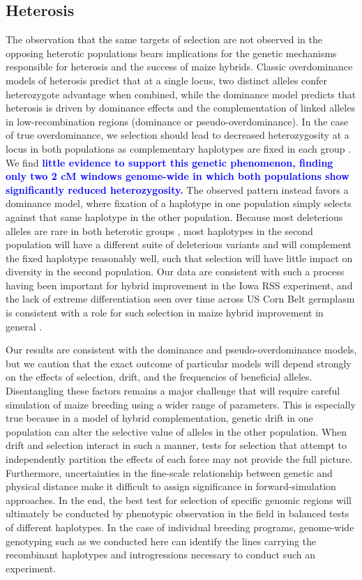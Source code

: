\documentclass[twocolumn,twoside,letterpaper]{article}
\newcommand{\rev}[1]{\textcolor{blue}{\bf #1}}
\begin{document}
\subsection*{Heterosis}

The observation that the same targets of selection are not observed in the opposing heterotic populations bears implications for the genetic mechanisms responsible for heterosis and the success of maize hybrids. 
Classic overdominance models of heterosis predict that at a single locus, two distinct alleles confer heterozygote advantage when combined, while the dominance model predicts that heterosis is driven by dominance effects and the complementation of linked alleles in low-recombination regions (dominance or pseudo-overdominance). 
In the case of true overdominance, we selection should lead to decreased heterozygosity at a locus in both populations as complementary haplotypes are fixed in each group \rev{\citep[e.g.][]{guo2014maize}}.
We find \rev{little evidence to support this genetic phenomenon, finding only two 2 cM windows genome-wide in which both populations show significantly reduced heterozygosity.} 
The observed pattern instead favors a dominance model, where fixation of a haplotype in one population simply selects against that same haplotype in the other population. 
Because most deleterious alleles are rare in both heterotic groups \citep{Mezmouk2014}, most haplotypes in the second population will have a different suite of deleterious variants and will complement the fixed haplotype reasonably well, such that selection will have little impact on diversity in the second population. 
Our data are consistent with such a process having been important for hybrid improvement in the Iowa RSS experiment, and the lack of extreme differentiation seen over time across US Corn Belt germplasm is consistent with a role for such selection in maize hybrid improvement in general \citep{van2012historical}.

Our results are consistent with the dominance and pseudo-overdominance models, but we caution that the exact outcome of particular models will depend strongly on the effects of selection, drift, and the frequencies of beneficial alleles. 
Disentangling these factors remains a major challenge that will require careful simulation of maize breeding using a wider range of parameters. 
This is especially true because in a model of hybrid complementation, genetic drift in one population can alter the selective value of alleles in the other population. 
When drift and selection interact in such a manner, tests for selection that attempt to independently partition the effects of each force may not provide the full picture. Furthermore, uncertainties in the fine-scale relationship between genetic and physical distance make it difficult to assign significance in forward-simulation approaches. 
In the end, the best test for selection of specific genomic regions will ultimately be conducted by phenotypic observation in the field in balanced tests of different haplotypes. 
In the case of individual breeding programs, genome-wide genotyping such as we conducted here can identify the lines carrying the recombinant haplotypes and introgressions necessary to conduct such an experiment. 
\end{document}
